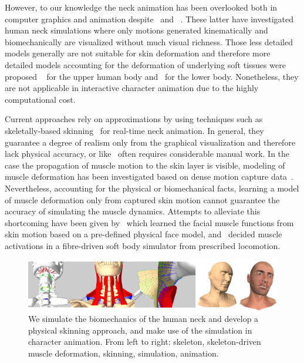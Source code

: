 However, to our knowledge the neck animation has been overlooked both in computer graphics and animation despite~\cite{Lee:2006:HUB} and ~\cite{vasavada:1998:influence}. These latter have investigated human neck simulations where only motions generated kinematically and biomechanically are visualized without much visual richness. Those less detailed models generally are not suitable for skin deformation and therefore more detailed models accounting for the deformation of underlying soft tissues were proposed ~\cite{Lee:2009:CBM} for the upper human body and~\cite{Assassi:2012:dynamic} for the lower body. Nonetheless, they are not applicable in interactive character animation due to the highly computational cost.

Current approaches rely on approximations by using techniques such as skeletally-based skinning~\cite{Kavan:2007:SDQ} for real-time neck animation. In general, they guarantee a degree of realism only from the graphical visualization and therefore lack physical accuracy, or like~\cite{Lewis:2000:PSD} often requires considerable manual work. In the case the propagation of muscle motion to the skin layer is visible, modeling of muscle deformation has been investigated based on dense motion capture data~\cite{Park:2008:DMS,Neumann:2013:muscles}. Nevertheless, accounting for the physical or biomechanical facts, learning a model of muscle deformation only from captured skin motion cannot guarantee the accuracy of simulating the muscle dynamics. Attempts to alleviate this shortcoming have been given by~\cite{Sifakis:2005:facial} which learned the facial muscle functions from skin motion based on a pre-defined physical face model, and~\cite{Tan:2012:SBL} decided muscle activations in a fibre-driven soft body simulator from prescribed locomotion.
\begin{figure}
\centering
\includegraphics[width=\linewidth]{vriphys/pipline}
\caption{We simulate the biomechanics of the human neck and develop a physical skinning approach, and make use of the simulation in character animation. From left to right: skeleton, skeleton-driven muscle deformation, skinning, simulation, animation.}
\label{fig:teaser}
\end{figure}


